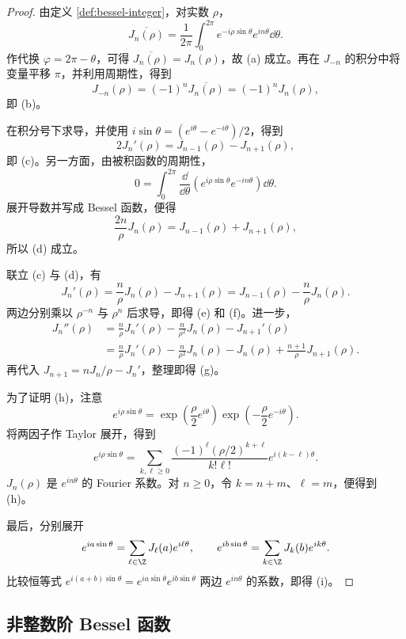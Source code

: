 \begin{proof}
	由定义 \ref{def:bessel-integer}，对实数 $\rho$，
	\[
	\overline{J_n(\rho)}
	=\frac{1}{2\pi}\int_0^{2\pi}
	e^{-i\rho\sin\theta}e^{in\theta}\dd\theta.
	\]
	作代换 $\varphi=2\pi-\theta$，可得
	$\overline{J_n(\rho)}=J_n(\rho)$，故 (a) 成立。再在 $J_{-n}$ 的积分中将变量平移 $\pi$，并利用周期性，得到
	\[
	J_{-n}(\rho)=(-1)^n\overline{J_n(\rho)}
	=(-1)^nJ_n(\rho),
	\]
	即 (b)。

	在积分号下求导，并使用
	$i\sin\theta=(e^{i\theta}-e^{-i\theta})/2$，得到
	\[
	2J_n'(\rho)=J_{n-1}(\rho)-J_{n+1}(\rho),
	\]
	即 (c)。另一方面，由被积函数的周期性，
	\[
	0=\int_0^{2\pi}\frac{\dd}{\dd\theta}
	\left(e^{i\rho\sin\theta}e^{-in\theta}\right)\dd\theta.
	\]
	展开导数并写成 Bessel 函数，便得
	\[
	\frac{2n}{\rho}J_n(\rho)
	=J_{n-1}(\rho)+J_{n+1}(\rho),
	\]
	所以 (d) 成立。

	联立 (c) 与 (d)，有
	\[
	J_n'(\rho)
	=\frac n\rho J_n(\rho)-J_{n+1}(\rho)
	=J_{n-1}(\rho)-\frac n\rho J_n(\rho).
	\]
	两边分别乘以 $\rho^{-n}$ 与 $\rho^n$ 后求导，即得 (e) 和 (f)。进一步，
	\[
	\begin{aligned}
	J_n''(\rho)
	&=\frac n\rho J_n'(\rho)-\frac n{\rho^2}J_n(\rho)
	-J_{n+1}'(\rho)\\
	&=\frac n\rho J_n'(\rho)-\frac n{\rho^2}J_n(\rho)
	-J_n(\rho)+\frac{n+1}{\rho}J_{n+1}(\rho).
	\end{aligned}
	\]
	再代入 $J_{n+1}=nJ_n/\rho-J_n'$，整理即得 (g)。

	为了证明 (h)，注意
	\[
	e^{i\rho\sin\theta}
	=\exp\left(\frac\rho2e^{i\theta}\right)
	 \exp\left(-\frac\rho2e^{-i\theta}\right).
	\]
	将两因子作 Taylor 展开，得到
	\[
	e^{i\rho\sin\theta}
	=\sum_{k,\ell\geq0}
	\frac{(-1)^\ell(\rho/2)^{k+\ell}}{k!\ell!}
	e^{i(k-\ell)\theta}.
	\]
	$J_n(\rho)$ 是 $e^{in\theta}$ 的 Fourier 系数。对 $n\geq0$，令
	$k=n+m$、$\ell=m$，便得到 (h)。

	最后，分别展开
	\[
	e^{ia\sin\theta}=\sum_{\ell\in\Z}J_\ell(a)e^{i\ell\theta},
	\qquad
	e^{ib\sin\theta}=\sum_{k\in\Z}J_k(b)e^{ik\theta}.
	\]
	比较恒等式
	$e^{i(a+b)\sin\theta}=e^{ia\sin\theta}e^{ib\sin\theta}$
	两边 $e^{in\theta}$ 的系数，即得 (i)。
\end{proof}

\subsection*{非整数阶 Bessel 函数}

